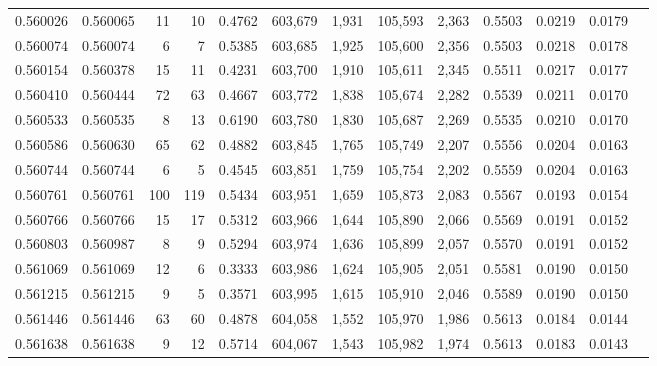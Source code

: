 \begin{tabular}{rrrrrrrrrrrrr}
0.560026 & 0.560065 &    11 &    10 &                                     0.4762 & 603,679 &   1,931 & 105,593 &   2,363 & 0.5503 & 0.0219 & 0.0179 \\
0.560074 & 0.560074 &     6 &     7 &                                     0.5385 & 603,685 &   1,925 & 105,600 &   2,356 & 0.5503 & 0.0218 & 0.0178 \\
0.560154 & 0.560378 &    15 &    11 &                                     0.4231 & 603,700 &   1,910 & 105,611 &   2,345 & 0.5511 & 0.0217 & 0.0177 \\
0.560410 & 0.560444 &    72 &    63 &                                     0.4667 & 603,772 &   1,838 & 105,674 &   2,282 & 0.5539 & 0.0211 & 0.0170 \\
0.560533 & 0.560535 &     8 &    13 &                                     0.6190 & 603,780 &   1,830 & 105,687 &   2,269 & 0.5535 & 0.0210 & 0.0170 \\
0.560586 & 0.560630 &    65 &    62 &                                     0.4882 & 603,845 &   1,765 & 105,749 &   2,207 & 0.5556 & 0.0204 & 0.0163 \\
0.560744 & 0.560744 &     6 &     5 &                                     0.4545 & 603,851 &   1,759 & 105,754 &   2,202 & 0.5559 & 0.0204 & 0.0163 \\
0.560761 & 0.560761 &   100 &   119 &                                     0.5434 & 603,951 &   1,659 & 105,873 &   2,083 & 0.5567 & 0.0193 & 0.0154 \\
0.560766 & 0.560766 &    15 &    17 &                                     0.5312 & 603,966 &   1,644 & 105,890 &   2,066 & 0.5569 & 0.0191 & 0.0152 \\
0.560803 & 0.560987 &     8 &     9 &                                     0.5294 & 603,974 &   1,636 & 105,899 &   2,057 & 0.5570 & 0.0191 & 0.0152 \\
0.561069 & 0.561069 &    12 &     6 &                                     0.3333 & 603,986 &   1,624 & 105,905 &   2,051 & 0.5581 & 0.0190 & 0.0150 \\
0.561215 & 0.561215 &     9 &     5 &                                     0.3571 & 603,995 &   1,615 & 105,910 &   2,046 & 0.5589 & 0.0190 & 0.0150 \\
0.561446 & 0.561446 &    63 &    60 &                                     0.4878 & 604,058 &   1,552 & 105,970 &   1,986 & 0.5613 & 0.0184 & 0.0144 \\
0.561638 & 0.561638 &     9 &    12 &                                     0.5714 & 604,067 &   1,543 & 105,982 &   1,974 & 0.5613 & 0.0183 & 0.0143 \\

\end{tabular}
